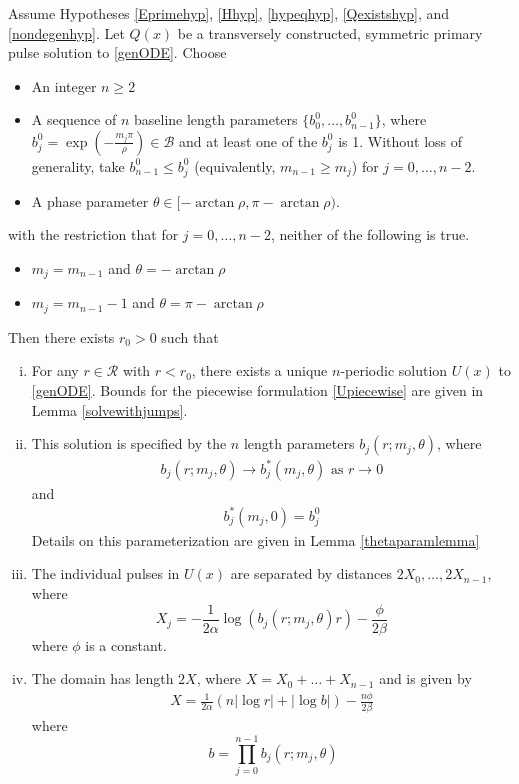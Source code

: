 \documentclass[thesis.tex]{subfiles}
\begin{document}
\begin{theorem}\label{perexist}
Assume Hypotheses \ref{Eprimehyp}, \ref{Hhyp}, \ref{hypeqhyp}, \ref{Qexistshyp}, and \ref{nondegenhyp}. Let $Q(x)$ be a transversely constructed, symmetric primary pulse solution to \eqref{genODE}. Choose
\begin{itemize}
\item An integer $n \geq 2$ 
\item A sequence of $n$ baseline length parameters $\{ b_0^0, \dots, b_{n-1}^0 \}$, where $b_j^0 = \exp\left(-\frac{m_j \pi}{\rho}\right) \in \mathcal{B}$ and at least one of the $b_j^0$ is 1. Without loss of generality, take $b_{n-1}^0 \leq b_j^0$ (equivalently, $m_{n-1} \geq m_j$) for $j = 0, \dots, n-2$.
\item A phase parameter $\theta \in [-\arctan \rho, \pi - \arctan \rho)$.
\end{itemize}
with the restriction that for $j = 0, \dots, n-2$, neither of the following is true.
\begin{itemize}
\item $m_j = m_{n-1}$ and $\theta = -\arctan \rho$
\item $m_j = m_{n-1} - 1$ and $\theta = \pi-\arctan \rho$
\end{itemize}
Then there exists $r_0 > 0$ such that
\begin{enumerate}[(i)]

\item For any $r \in \mathcal{R}$ with $r < r_0$, there exists a unique $n$-periodic solution $U(x)$ to \eqref{genODE}. Bounds for the piecewise formulation \eqref{Upiecewise} are given in Lemma \ref{solvewithjumps}.

\item This solution is specified by the $n$ length parameters $b_j(r; m_j, \theta)$, where
\begin{align}
b_j(r; m_j, \theta) \rightarrow b^*_j(m_j, \theta) \text{ as } r \rightarrow 0
\end{align}
and
\begin{align}
b^*_j(m_j, 0) = b_j^0
\end{align}
Details on this parameterization are given in Lemma \ref{thetaparamlemma}

\item The individual pulses in $U(x)$ are separated by distances $2 X_0, \dots, 2 X_{n-1}$, where 
\begin{equation}\label{Xj}
X_j = -\frac{1}{2\alpha}\log(b_j(r; m_j, \theta) r) - \frac{\phi}{2 \beta} 
\end{equation}
where $\phi$ is a constant.

\item The domain has length $2X$, where $X = X_0 + \dots + X_{n-1}$ and is given by
\begin{align}
X = \frac{1}{2\alpha} (n |\log r| + |\log b| ) - \frac{n \phi}{2 \beta}
\end{align}
where 
\begin{equation}\
b = \prod_{j=0}^{n-1} b_j(r; m_j, \theta)
\end{equation}
\end{enumerate}
\end{theorem}
\end{document}
